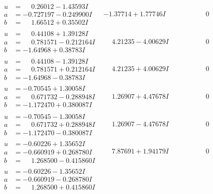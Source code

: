 \documentclass[1p]{elsarticle_modified}
\theoremstyle{definition}
\begin{document}
$$\begin{array}{c|c|c}
\begin{aligned}
u &= \phantom{-}0.26012 - 1.43593 I \\
a &= -0.727197 - 0.249900 I \\
b &= \phantom{-}1.66512 + 0.35502 I\end{aligned}
 & -1.37714 + 1.77746 I & \phantom{-0.000000 } 0 \\ \hline\begin{aligned}
u &= \phantom{-}0.44108 + 1.39128 I \\
a &= \phantom{-}0.781571 - 0.212164 I \\
b &= -1.64968 + 0.38783 I\end{aligned}
 & \phantom{-}4.21235 - 4.00629 I & \phantom{-0.000000 } 0 \\ \hline\begin{aligned}
u &= \phantom{-}0.44108 - 1.39128 I \\
a &= \phantom{-}0.781571 + 0.212164 I \\
b &= -1.64968 - 0.38783 I\end{aligned}
 & \phantom{-}4.21235 + 4.00629 I & \phantom{-0.000000 } 0 \\ \hline\begin{aligned}
u &= -0.70545 + 1.30058 I \\
a &= \phantom{-}0.671732 - 0.288948 I \\
b &= -1.172470 + 0.380087 I\end{aligned}
 & \phantom{-}1.26907 + 4.47678 I & \phantom{-0.000000 } 0 \\ \hline\begin{aligned}
u &= -0.70545 - 1.30058 I \\
a &= \phantom{-}0.671732 + 0.288948 I \\
b &= -1.172470 - 0.380087 I\end{aligned}
 & \phantom{-}1.26907 - 4.47678 I & \phantom{-0.000000 } 0 \\ \hline\begin{aligned}
u &= -0.60226 + 1.35652 I \\
a &= -0.660919 + 0.268780 I \\
b &= \phantom{-}1.268500 - 0.415860 I\end{aligned}
 & \phantom{-}7.87691 + 1.94179 I & \phantom{-0.000000 } 0 \\ \hline\begin{aligned}
u &= -0.60226 - 1.35652 I \\
a &= -0.660919 - 0.268780 I \\
b &= \phantom{-}1.268500 + 0.415860 I\end{aligned}

\end{array}$$
\end{document}
